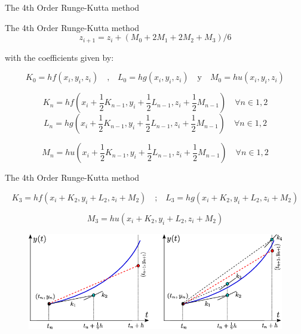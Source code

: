 \documentclass[hyperref={pdfpagelabels=false}]{beamer}
\begin{document}
\begin{frame}{The 4th Order Runge-Kutta method}

\begin{block}{The 4th Order Runge-Kutta method}
\begin{equation*}
z_{i+1}=z_{i}+(M_{0}+2M_{1}+2M_{2}+M_{3})/6 
\end{equation*}
\end{block}
\vspace{10pt}

with the coefficients given by:

\begin{equation*}
K_{0}=hf(x_{i},y_{i},z_{i}) \quad \text{,} \quad L_{0}=hg(x_{i},y_{i},z_{i}) \quad \text{y} \quad M_{0}=hu(x_{i},y_{i},z_{i})
\end{equation*}

\begin{equation*}
K_{n}=hf(x_{i}+\frac{1}{2}K_{n-1},y_{i}+\frac{1}{2}L_{n-1},z_{i}+\frac{1}{2}M_{n-1}) \quad \forall n \in {1,2}
\end{equation*}
\begin{equation*}
L_{n}=hg(x_{i}+\frac{1}{2}K_{n-1},y_{i}+\frac{1}{2}L_{n-1},z_{i}+\frac{1}{2}M_{n-1}) \quad \forall n \in {1,2}
\end{equation*}

\begin{equation*}
M_{n}=hu(x_{i}+\frac{1}{2}K_{n-1},y_{i}+\frac{1}{2}L_{n-1},z_{i}+\frac{1}{2}M_{n-1}) \quad \forall n \in {1,2}
\end{equation*}



    
\end{frame}

\begin{frame}{The 4th Order Runge-Kutta method}

\begin{equation*}
K_{3}=hf(x_{i}+K_{2},y_{i}+L_{2},z_{i}+M_{2}) \quad \text{;} \quad L_{3}=hg(x_{i}+K_{2},y_{i}+L_{2},z_{i}+M_{2})
\end{equation*}



\begin{equation*}
M_{3}=hu(x_{i}+K_{2},y_{i}+L_{2},z_{i}+M_{2})
\end{equation*}

\begin{figure}
        \includegraphics[width=0.8\linewidth]{Figures/4thorder.png}\\ \vspace{10pt}
    \end{figure}

\end{frame}
\end{document}

